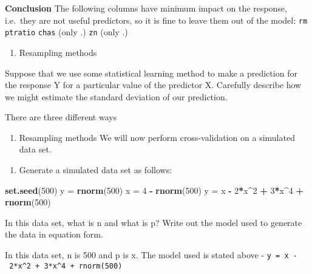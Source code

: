 \documentclass[]{article}
\newenvironment{Shaded}{\begin{snugshade}}{\end{snugshade}}
\newcommand{\KeywordTok}[1]{\textcolor[rgb]{0.13,0.29,0.53}{\textbf{#1}}}
\newcommand{\DecValTok}[1]{\textcolor[rgb]{0.00,0.00,0.81}{#1}}
\newcommand{\StringTok}[1]{\textcolor[rgb]{0.31,0.60,0.02}{#1}}
\newcommand{\OperatorTok}[1]{\textcolor[rgb]{0.81,0.36,0.00}{\textbf{#1}}}
\newcommand{\NormalTok}[1]{#1}
\providecommand{\tightlist}{%
  \setlength{\itemsep}{0pt}\setlength{\parskip}{0pt}}
\begin{document}
\textbf{Conclusion} The following columns have minimum impact on the
response, i.e.~they are not useful predictors, so it is fine to leave
them out of the model: \texttt{rm} \texttt{ptratio} \texttt{chas} (only
.) \texttt{zn} (only .)

\begin{enumerate}
\def\labelenumi{\arabic{enumi}.}
\setcounter{enumi}{5}
\tightlist
\item
  Resampling methods
\end{enumerate}

Suppose that we use some statistical learning method to make a
prediction for the response Y for a particular value of the predictor X.
Carefully describe how we might estimate the standard deviation of our
prediction.

There are three different ways

\begin{enumerate}
\def\labelenumi{\arabic{enumi}.}
\setcounter{enumi}{6}
\tightlist
\item
  Resampling methods We will now perform cross-validation on a simulated
  data set.
\end{enumerate}

\begin{enumerate}
\def\labelenumi{(\alph{enumi})}
\tightlist
\item
  Generate a simulated data set as follows:
\end{enumerate}

\begin{Shaded}
\begin{Highlighting}[]
\KeywordTok{set.seed}\NormalTok{(}\DecValTok{500}\NormalTok{)}
\NormalTok{y =}\StringTok{ }\KeywordTok{rnorm}\NormalTok{(}\DecValTok{500}\NormalTok{)}
\NormalTok{x =}\StringTok{ }\DecValTok{4} \OperatorTok{-}\StringTok{ }\KeywordTok{rnorm}\NormalTok{(}\DecValTok{500}\NormalTok{)}
\NormalTok{y =}\StringTok{ }\NormalTok{x }\OperatorTok{-}\StringTok{ }\DecValTok{2}\OperatorTok{*}\NormalTok{x}\OperatorTok{^}\DecValTok{2} \OperatorTok{+}\StringTok{ }\DecValTok{3}\OperatorTok{*}\NormalTok{x}\OperatorTok{^}\DecValTok{4} \OperatorTok{+}\StringTok{ }\KeywordTok{rnorm}\NormalTok{(}\DecValTok{500}\NormalTok{)}
\end{Highlighting}
\end{Shaded}

In this data set, what is n and what is p? Write out the model used to
generate the data in equation form.

In this data set, n is 500 and p is x. The model used is stated above -
\texttt{y\ =\ x\ -\ 2*x\^{}2\ +\ 3*x\^{}4\ +\ rnorm(500)}
\end{document}
